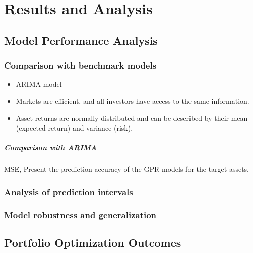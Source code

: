 
\chapter{Results and Analysis}\label{chapter:results and analysis}

\section{Model Performance Analysis}

\subsection{Comparison with benchmark models}

\begin{itemize}
    \item ARIMA model
    \item Markets are efficient, and all investors have access to the same information.
    \item Asset returns are normally distributed and can be described by their mean (expected return) and variance (risk).
\end{itemize}

\paragraph{Comparison with ARIMA}

MSE, Present the prediction accuracy of the GPR models for the target assets.


\subsection{Analysis of prediction intervals}

\subsection{Model robustness and generalization}

\section{Portfolio Optimization Outcomes}


